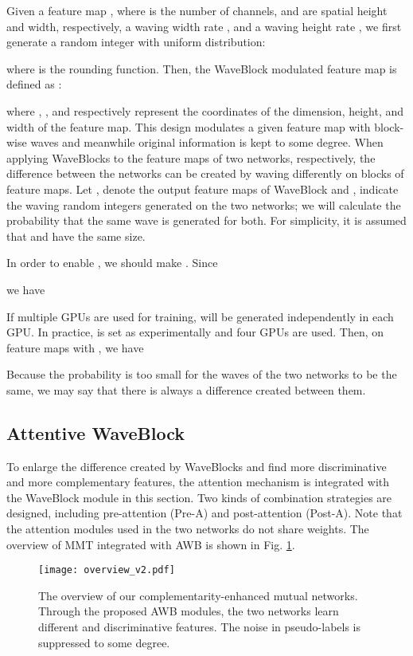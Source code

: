 \documentclass[journal]{IEEEtran}
\begin{document}
Given a feature map , where  is the number of channels,  and  are spatial height and width, respectively, a waving width rate , and a waving height rate , we first generate a random integer with uniform distribution: 

where  is the rounding function. Then, the WaveBlock modulated feature map is defined as :

where , , and  respectively represent the coordinates of the dimension, height, and width of the feature map. This design modulates a given feature map with block-wise waves and meanwhile original information is kept to some degree. When applying WaveBlocks to the feature maps  of two networks, respectively, the difference between the networks can be created by waving differently on blocks of feature maps. Let ,  denote the output feature maps of WaveBlock and ,  indicate the waving random integers generated on the two networks; we will calculate the probability that the same wave is generated for both. For simplicity, it is assumed that  and  have the same size.\par 
In order to enable , we should make . 
Since

we have

If multiple GPUs are used for training,  will be generated independently in each GPU. In practice,  is set as  experimentally and four GPUs are used. Then, on feature maps with , we have

Because the probability is too small for the waves of the two networks to be the same, we may say that there is always a difference created between them.

\subsection{Attentive WaveBlock}
To enlarge the difference created by WaveBlocks and find more discriminative and more complementary features, the attention mechanism is integrated with the WaveBlock module in this section. Two kinds of combination strategies are designed, including pre-attention (Pre-A) and post-attention (Post-A).  Note that the attention modules used in the two networks do not share weights. The overview of MMT \cite{ge2020mutual} integrated with AWB is shown in Fig. \ref{overview}.

\begin{figure}[t]  
\centering  
\texttt{[image: overview\_v2.pdf]} 
\caption{The overview of our complementarity-enhanced mutual networks. Through the proposed AWB modules, the two networks learn different and discriminative features. The noise in pseudo-labels is suppressed to some degree.}  
\label{overview}  
\end{figure}
\end{document}
